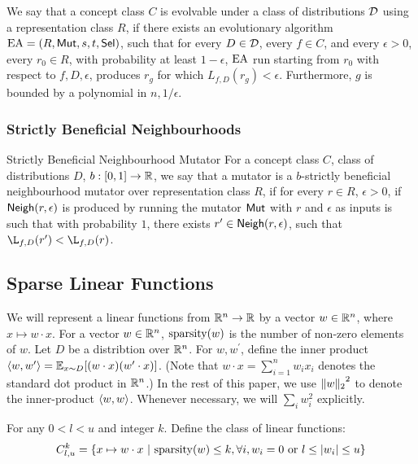 \begin{definition} We say that a concept class $C$ is evolvable under a class of
distributions ${\mathcal D}$ using a representation class $R$, if there exists an
evolutionary algorithm $\mathrm{EA} = (R, \mathsf{Mut}, s, t, \mathsf{Sel})$, such that for every $D
\in {\mathcal D}$, every $f \in C$, and every $\epsilon > 0$, every $r_0 \in R$, with
probability at least $1 - \epsilon$, $\mathrm{EA}$ run starting from $r_0$ with
respect to $f, D, \epsilon$, produces $r_g$ for which $L_{f, D}(r_g) <
\epsilon$. Furthermore, $g$ is bounded by a polynomial in $n, 1/\epsilon$.
\end{definition}

\subsubsection{Strictly Beneficial Neighbourhoods}

\begin{definition}{Strictly Beneficial Neighbourhood Mutator} For a concept class
$C$, class of distributions $D$, $b : [0, 1] \rightarrow \mathbb{R}$, we say that a
mutator is a $b$-strictly beneficial neighbourhood mutator over representation
class $R$, if for every $r \in R$, $\epsilon > 0$, if $\mathsf{Neigh}(r, \epsilon)$ is
produced by running the mutator $\mathsf{Mut}$ with $r$ and $\epsilon$ as inputs is such
that with probability $1$, there exists $r^\prime \in \mathsf{Neigh}(r, \epsilon)$, such
that $\L_{f, D}(r^\prime) < \L_{f, D}(r)$.
\end{definition}

\subsection{Sparse Linear Functions} 

We will represent a linear functions from $\mathbb{R}^n \rightarrow \mathbb{R}$ by a
vector $w \in \mathbb{R}^n$, where $x \mapsto w \cdot x$.  For a vector $w \in
\mathbb{R}^n$, $\mathrm{sparsity}(w)$ is the number of non-zero elements of $w$. Let $D$ be a
distribtion over $\mathbb{R}^n$. For $w, w^\prime$, define the inner product
$\langle w, w^\prime \rangle = \mathbb{E}_{x \sim D}[(w \cdot x) (w^\prime \cdot x)]$. (Note that
$w \cdot x = \sum_{i = 1}^n w_i x_i$ denotes the standard dot product in
$\mathbb{R}^n$.) In the rest of this paper, we use ${\Vert w \Vert_{2}}^2$ to denote the
inner-product $\langle w, w \rangle$. Whenever necessary, we will $\sum_{i} w_i^2$
explicitly.

For any $0 < l < u$ and integer $k$. Define the class of linear functions:
\[
C^k_{l, u} = \{ x \mapsto w \cdot x ~|~ \mathrm{sparsity}(w) \leq k, \forall i,
w_i = 0 \mbox{ or } l \leq |w_i| \leq u \}
\]

